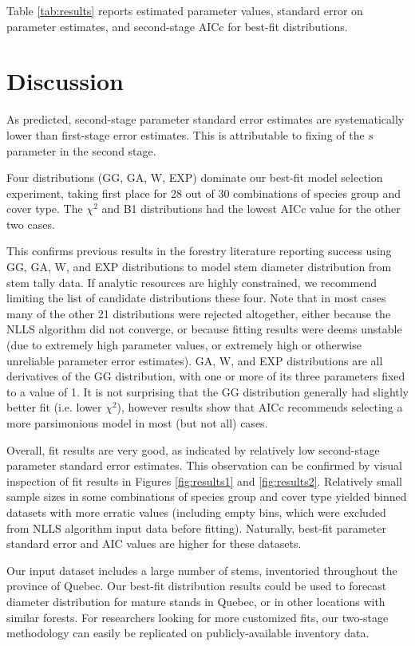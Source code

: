 \documentclass{article}
\begin{document}
Table \ref{tab:results} reports estimated parameter values, standard error on parameter estimates, and second-stage AICc for best-fit distributions. 



\section{Discussion}
\label{sec:discussion}

As predicted, second-stage parameter standard error estimates are systematically lower than first-stage error estimates.
This is attributable to fixing of the $s$ parameter in the second stage. 

Four distributions (GG, GA, W, EXP) dominate our best-fit model selection experiment, taking first place for 28 out of 30 combinations of species group and cover type. 
The $\chi^2$ and B1 distributions had the lowest AICc value for the other two cases.

This confirms previous results in the forestry literature reporting success using GG, GA, W, and EXP distributions to model stem diameter distribution from stem tally data.
If analytic resources are highly constrained, we recommend limiting the list of candidate distributions these four.
Note that in most cases many of the other 21 distributions were rejected altogether, either because the NLLS algorithm did not converge, or because fitting results were deems unstable (due to extremely high parameter values, or extremely high or otherwise unreliable parameter error estimates).
GA, W, and EXP distributions are all derivatives of the GG distribution, with one or more of its three parameters fixed to a value of 1. 
It is not surprising that the GG distribution generally had slightly better fit (i.e. lower $\chi^2$), however results show that AICc recommends selecting a more parsimonious model in most (but not all) cases.

Overall, fit results are very good, as indicated by relatively low second-stage parameter standard error estimates.
This observation can be confirmed by visual inspection of fit results in Figures \ref{fig:results1} and \ref{fig:results2}.
Relatively small sample sizes in some combinations of species group and cover type yielded binned datasets with more erratic values (including empty bins, which were excluded from NLLS algorithm input data before fitting).
Naturally, best-fit parameter standard error and AIC values are higher for these datasets. 

Our input dataset includes a large number of stems, inventoried throughout the province of Quebec.
Our best-fit distribution results could be used to forecast diameter distribution for mature stands in Quebec, or in other locations with similar forests.
For researchers looking for more customized fits, our two-stage methodology can easily be replicated on publicly-available inventory data.
\end{document}
